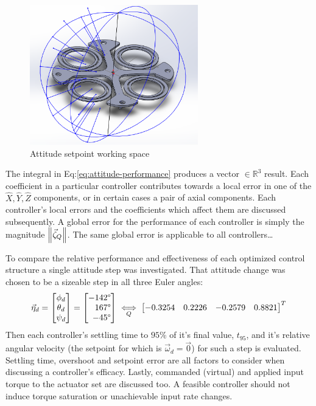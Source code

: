 \begin{figure}[htbp]
\centering
\includegraphics[width=0.65\textwidth]{figs/attitude-setpoint}
\caption{Attitude setpoint working space}
\label{fig:attitude-setpoint}
\end{figure}
\par
The integral in Eq:\ref{eq:attitude-performance} produces a vector $\in\mathbb{R}^{3}$ result. Each coefficient in a particular controller contributes towards a local error in one of the $\hat{X},\hat{Y},\hat{Z}$ components, or in certain cases a pair of axial components. Each controller's local errors and the coefficients which affect them are discussed subsequently. A global error for the performance of each controller is simply the magnitude $\left\lVert\vec{\zeta}_Q\right\rVert$. The same global error is applicable to all controllers\ldots
\par
To compare the relative performance and effectiveness of each optimized control structure a single attitude step was investigated. That attitude change was chosen to be a sizeable step in all three Euler angles:
\begin{equation}\label{eq:attitude-step-position}
\vec{\eta}_d=\begin{bmatrix}
\phi_d\\
\theta_d\\
\psi_d\\
\end{bmatrix}
=
\begin{bmatrix*}[r]
-142\text{\textdegree}\\
167\text{\textdegree}\\
-45\text{\textdegree}
\end{bmatrix*}
\underset{Q}{\iff}
\begin{bmatrix}
-0.3254&
0.2226&
-0.2579&
0.8821
\end{bmatrix}^T
\end{equation}
Then each controller's settling time to $95$\% of it's final value, $t_{95}$, and it's relative angular velocity (the setpoint for which is $\vec{\omega}_d=\vec{0}$) for such a step is evaluated. Settling time, overshoot and setpoint error are all factors to consider when discussing a controller's efficacy. Lastly, commanded (virtual) and applied input torque to the actuator set are discussed too. A feasible controller should not induce torque saturation or unachievable input rate changes.
